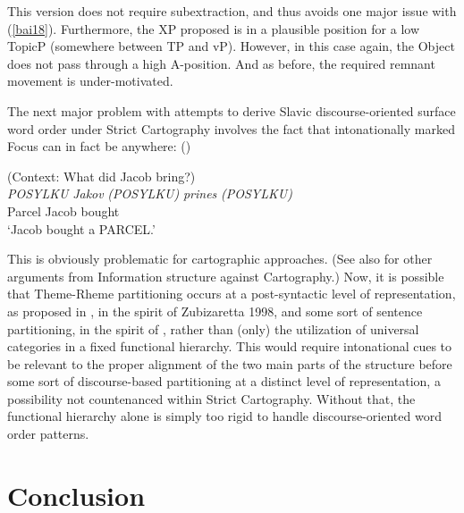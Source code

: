 \documentclass[output=paper,colorlinks,citecolor=brown,
]{langscibook}
\begin{document}
This version does not require subextraction, and thus avoids one major issue with (\ref{bai18}). Furthermore, the XP proposed is in a plausible position for a low TopicP (somewhere between TP and vP). However, in this case again, the Object does not pass through a high A-position. And as before, the required remnant movement is under-motivated. 

The next major problem with attempts to derive Slavic discourse-oriented surface word order under Strict Cartography involves the fact that intonationally marked Focus can in fact be anywhere: (\citealt{Bailyn2012})

\begin{exe}
\ex \label{bai20}
(Context: What did Jacob bring?) \\
\gll \emph{POSYLKU}	\emph{Jakov}	\emph{(POSYLKU)} \emph{prines}		\emph{(POSYLKU)} \\ 
Parcel Jacob {} bought \\
\glt `Jacob bought a PARCEL.'\\
\end{exe}

This is obviously problematic for cartographic approaches. (See also \citealt{wagner2009focus} for other arguments from Information structure against Cartography.) Now, it is possible that Theme-Rheme partitioning occurs at a post-syntactic level of representation, as proposed in \citealt{Bailyn2012}, in the spirit of Zubizaretta 1998, and some sort of sentence partitioning, in the spirit of \citealt{Diesing1992}, rather than (only) the utilization of universal categories in a fixed functional hierarchy. This would require intonational cues to be relevant to the proper alignment of the two main parts of the structure before some sort of discourse-based partitioning at a distinct level of representation, a possibility not countenanced within Strict Cartography. Without that, the functional hierarchy alone is simply too rigid to handle discourse-oriented word order patterns.

\section{Conclusion}
\end{document}
